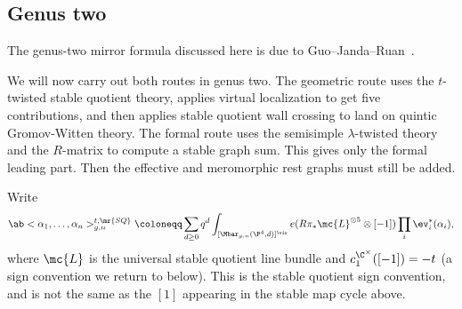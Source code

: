 \subsection{Genus two}%
\label{sub:Genus two}

The genus-two mirror formula discussed here is due to Guo--Janda--Ruan~\cite{GJRgenus2}.

We will now carry out both routes in genus two. The geometric route uses the \(t\)-twisted stable quotient theory, applies virtual localization to get five contributions, and then applies stable quotient wall crossing to land on quintic Gromov-Witten theory. The formal route uses the semisimple \(\lambda\)-twisted theory and the \(R\)-matrix to compute a stable graph sum. This gives only the formal leading part. Then the effective and meromorphic rest graphs must still be added.

\begin{notn}
    Write
    \[ \ab<\alpha_1, \ldots, \alpha_n>^{t,\mr{SQ}}_{g,n} \coloneqq \sum_{d\geq0}q^d \int_{[\Mbar_{g,n}(\P^4,d)]^{\vir}}e(R\pi_*\mc{L}^{\otimes 5}\otimes[-1])\prod_i \ev_i^*(\alpha_i), \]
    where \(\mc{L}\) is the universal stable quotient line bundle and \(c_1^{\C^{\times}}([-1]) = -t\) (a sign convention we return to below). This is the stable quotient sign convention, and is not the same as the \([1]\) appearing in the stable map cycle above.
\end{notn}


